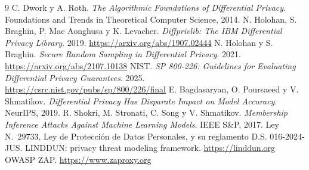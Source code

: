\documentclass[11pt]{article}
\begin{document}
\begin{thebibliography}{9}
 C. Dwork y A. Roth. \emph{The Algorithmic Foundations of Differential Privacy}. Foundations and Trends in Theoretical Computer Science, 2014.
 N. Holohan, S. Braghin, P. Mac Aonghusa y K. Levacher. \emph{Diffprivlib: The IBM Differential Privacy Library}. 2019. \url{https://arxiv.org/abs/1907.02444}
 N. Holohan y S. Braghin. \emph{Secure Random Sampling in Differential Privacy}. 2021. \url{https://arxiv.org/abs/2107.10138}
 NIST. \emph{SP 800-226: Guidelines for Evaluating Differential Privacy Guarantees}. 2025. \url{https://csrc.nist.gov/pubs/sp/800/226/final}
 E. Bagdasaryan, O. Poursaeed y V. Shmatikov. \emph{Differential Privacy Has Disparate Impact on Model Accuracy}. NeurIPS, 2019.
 R. Shokri, M. Stronati, C. Song y V. Shmatikov. \emph{Membership Inference Attacks Against Machine Learning Models}. IEEE S\&P, 2017.
 Ley N.\textdegree{}~29733, Ley de Protección de Datos Personales, y su reglamento D.S. 016-2024-JUS.
 LINDDUN: privacy threat modeling framework. \url{https://linddun.org}
 OWASP ZAP. \url{https://www.zaproxy.org}
\end{thebibliography}
\end{document}
